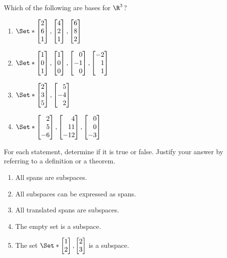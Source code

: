 \begin{exercises}
\begin{problist}
		\prob Which of the following are bases for $\R^3$?
		\begin{enumerate}
			\item $\Set*{\mat{2\\6\\1}, \mat{4\\2\\1}, \mat{6\\8\\2}}$
			\item $\Set*{\mat{1\\0\\1}, \mat{1\\0\\0}, \mat{0\\-1\\0}, \mat{-2\\1\\1}}$
			\item $\Set*{\mat{2\\3\\5}, \mat{5\\-4\\2}}$
			\item $\Set*{\mat{2\\5\\-6}, \mat{4\\11\\-12}, \mat{0\\0\\-3}}$
		\end{enumerate}
		\begin{solution}
		
		\end{solution}

		\prob  For each statement, determine if it is true or false.
		Justify your answer by referring to a definition or a theorem.
		\begin{enumerate}
			\item All spans are subspaces.
			\item All subspaces can be expressed as spans.
			\item All translated spans are subspaces.
			\item The empty set is a subspace.
			\item The set $\Set*{\mat{1\\2}, \mat{2\\3}}$ is a subspace.
		\end{enumerate}
		\begin{solution}
		

\end{solution}
\end{problist}
\end{exercises}
